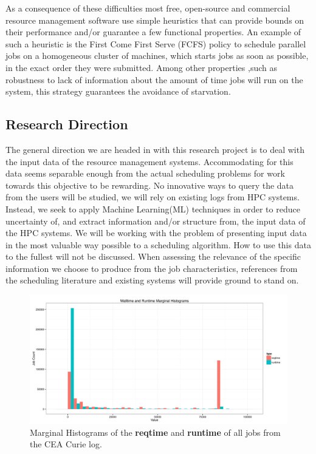 \documentclass{article}
\begin{document}
As a consequence of these difficulties most free, open-source and commercial resource management software use simple heuristics that can provide bounds on their performance and/or guarantee a few functional properties.
An example of such a heuristic is the First Come First Serve (FCFS) policy to schedule parallel jobs on a homogeneous cluster of machines, which starts jobs as soon as possible, in the exact order they were submitted.
Among other properties ,such as robustness to lack of information about the amount of time jobs will run on the system, this strategy guarantees the avoidance of starvation.

\subsection{Research Direction}
The general direction we are headed in with this research project is to deal with the input data of the resource management systems.
Accommodating for this data seems separable enough from the actual scheduling problems for work towards this objective to be rewarding.
No innovative ways to query the data from the users will be studied, we will rely on existing logs from HPC systems. Instead, we seek to apply Machine Learning(ML) techniques in order to reduce uncertainty of, and extract information and/or structure from, the input data of the HPC systems.
We will be working with the problem of presenting input data in the most valuable way possible to a scheduling algorithm. How to use this data to the fullest will not be discussed.
When assessing the relevance of the specific information we choose to produce from the job characteristics, references from the scheduling literature and existing systems will provide ground to stand on.


\begin{figure}[b]
  \centering
        \includegraphics[width=\textwidth]{../../wallimage-0.png}
        \caption{Marginal Histograms of the \textbf{reqtime} and \textbf{runtime} of all jobs from the CEA Curie log.}
\label{fig:_wall_run_for_report_pdf}
\end{figure}
\end{document}
